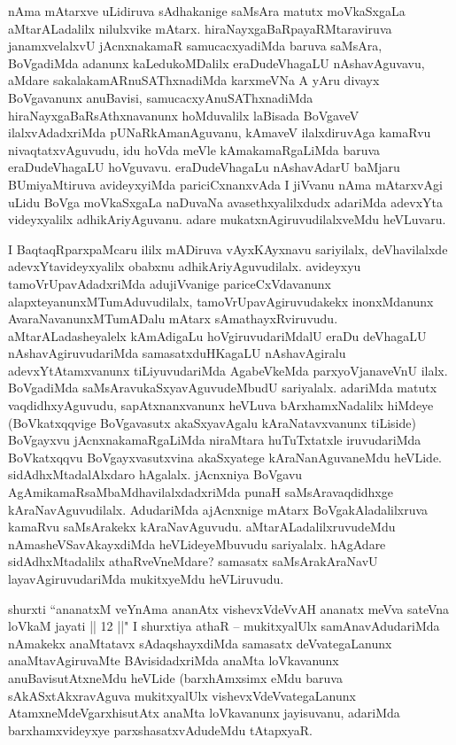 \begin{artha}
nAma mAtarxve uLidiruva sAdhakanige saMsAra matutx moVkaSxgaLa aMtarALadalilx nilulxvike mAtarx. hiraNayxgaBaRpayaRMtaraviruva janamxvelalxvU jAcnxnakamaR samucacxyadiMda baruva saMsAra, BoVgadiMda adanunx kaLedukoMDalilx eraDudeVhagaLU nAshavAguvavu, aMdare sakalakamARnuSAThxnadiMda karxmeVNa A yAru divayx BoVgavanunx anuBavisi, samucacxyAnuSAThxnadiMda hiraNayxgaBaRsAthxnavanunx hoMduvalilx laBisada BoVgaveV ilalxvAdadxriMda pUNaRkAmanAguvanu, kAmaveV ilalxdiruvAga kamaRvu nivaqtatxvAguvudu, idu hoVda meVle kAmakamaRgaLiMda baruva eraDudeVhagaLU hoVguvavu. eraDudeVhagaLu nAshavAdarU baMjaru BUmiyaMtiruva avideyxyiMda pariciCxnanxvAda I jiVvanu nAma mAtarxvAgi uLidu BoVga moVkaSxgaLa naDuvaNa avasethxyalilxdudx adariMda adevxYta videyxyalilx adhikAriyAguvanu. adare mukatxnAgiruvudilalxveMdu heVLuvaru.
\end{artha}

\begin{artha}
I BaqtaqRparxpaMcaru ililx mADiruva vAyxKAyxnavu sariyilalx, deVhavilalxde adevxYtavideyxyalilx obabxnu adhikAriyAguvudilalx. avideyxyu tamoVrUpavAdadxriMda adujiVvanige pariceCxVdavanunx alapxteyanunxMTumAduvudilalx, tamoVrUpavAgiruvudakekx inonxMdanunx AvaraNavanunxMTumADalu mAtarx sAmathayxRviruvudu. aMtarALadasheyalelx kAmAdigaLu hoVgiruvudariMdalU eraDu deVhagaLU nAshavAgiruvudariMda samasatxduHKagaLU nAshavAgiralu adevxYtAtamxvanunx tiLiyuvudariMda AgabeVkeMda parxyoVjanaveVnU ilalx. BoVgadiMda saMsAravukaSxyavAguvudeMbudU sariyalalx. adariMda matutx vaqdidhxyAguvudu, sapAtxnanxvanunx heVLuva bArxhamxNadalilx hiMdeye (BoVkatxqqvige BoVgavasutx akaSxyavAgalu kAraNatavxvanunx tiLiside) BoVgayxvu jAcnxnakamaRgaLiMda niraMtara huTuTxtatxle iruvudariMda BoVkatxqqvu BoVgayxvasutxvina akaSxyatege kAraNanAguvaneMdu heVLide. sidAdhxMtadalAlxdaro hAgalalx. jAcnxniya BoVgavu AgAmikamaRsaMbaMdhavilalxdadxriMda punaH saMsAravaqdidhxge kAraNavAguvudilalx. AdudariMda ajAcnxnige mAtarx BoVgakAladalilxruva kamaRvu saMsArakekx kAraNavAguvudu. aMtarALadalilxruvudeMdu nAmasheVSavAkayxdiMda heVLideyeMbuvudu sariyalalx. hAgAdare sidAdhxMtadalilx athaRveVneMdare? samasatx saMsArakAraNavU layavAgiruvudariMda mukitxyeMdu heVLiruvudu.
\end{artha}

\begin{artha}
shurxti ``ananatxM veYnAma ananAtx vishevxVdeVvAH ananatx meVva sateVna loVkaM jayati || 12 ||" I shurxtiya athaR --  mukitxyalUlx samAnavAdudariMda nAmakekx anaMtatavx sAdaqshayxdiMda samasatx deVvategaLanunx anaMtavAgiruvaMte BAvisidadxriMda anaMta loVkavanunx anuBavisutAtxneMdu heVLide (barxhAmxsimx eMdu baruva sAkASxtAkxravAguva mukitxyalUlx vishevxVdeVvategaLanunx AtamxneMdeVgarxhisutAtx anaMta loVkavanunx jayisuvanu, adariMda barxhamxvideyxye parxshasatxvAdudeMdu tAtapxyaR.
\end{artha}

